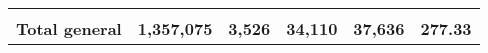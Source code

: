 \begin{tabular}{lrcclr}
	& \multicolumn{1}{l}{}                                           & \multicolumn{1}{l}{}                                       & \multicolumn{1}{l}{} &                                                                     & \multicolumn{1}{l}{}                                                         \\
	\rowcolor[HTML]{DDEBF7} 
	\textbf{Total   general}                                       & \textbf{1,357,075}                                             & \multicolumn{1}{r}{\cellcolor[HTML]{DDEBF7}\textbf{3,526}} & \textbf{34,110}      & \textbf{37,636}                                                     & \textbf{277.33}                                                             
\end{tabular}